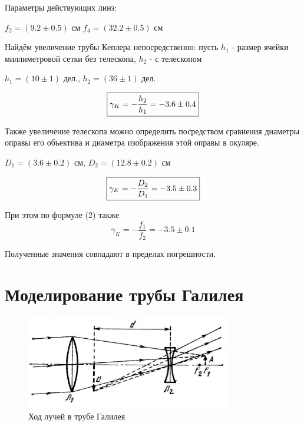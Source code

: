 \documentclass[a4paper,12pt]{article} %
\begin{document}
\begin{enumerate}
Параметры действующих линз:
\begin{center}
    $ f_2 = (9.2\pm0.5) $ см \hspace{1cm} $f_4 = (32.2\pm0.5) $ см
\end{center}

Найдём увеличение трубы Кеплера непосредственно: пусть $h_1$ - размер ячейки миллиметровой сетки без телескопа, $h_2$ - с телескопом
\begin{center}
$h_1 = (10 \pm 1)$ дел., \hspace{1cm} $h_2 = (36 \pm 1)$ дел.
\end{center}
\[\boxed{\normalsize\gamma_K = -\frac{h_2}{h_1} = -3.6 \pm 0.4} \]


Также увеличение телескопа можно определить посредством сравнения диаметры оправы его объектива и диаметра изображения этой оправы в окуляре.
\begin{center}
	$D_1 = (3.6 \pm 0.2)$ см, \hspace{1cm} $D_2 = (12.8 \pm 0.2)$ см
\end{center}
\[\boxed{\normalsize\gamma_K = -\frac{D_2}{D_1} = -3.5 \pm 0.3} \]


При этом по формуле (2) также
    \[ \boxed{\gamma_K = -\frac{f_1}{f_2} = -3.5 \pm 0.1} \] 


Полученные значения совпадают в пределах погрешности.
\end{enumerate}

\section*{Моделирование трубы Галилея}
    \begin{figure}[h]
    \centering
    \includegraphics[width=9cm]{gal.PNG}
    \caption{Ход лучей в трубе Галилея}
    \label{fig:vac}
\end{figure}
\end{document}
